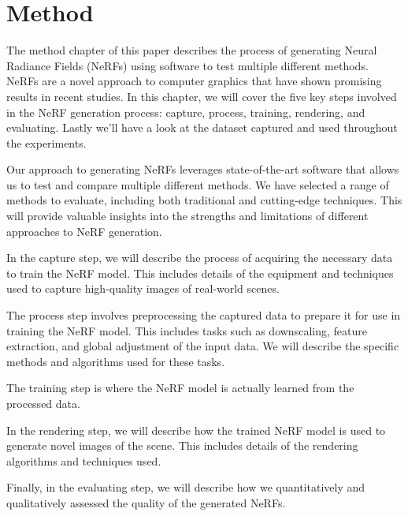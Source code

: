 \chapter{Method}

The method chapter of this paper describes the process of generating Neural Radiance Fields (NeRFs) using software to test multiple different methods. NeRFs are a novel approach to computer graphics that have shown promising results in recent studies. In this chapter, we will cover the five key steps involved in the NeRF generation process: capture, process, training, rendering, and evaluating. Lastly we'll have a look at the dataset captured and used throughout the experiments.

Our approach to generating NeRFs leverages state-of-the-art software that allows us to test and compare multiple different methods. We have selected a range of methods to evaluate, including both traditional and cutting-edge techniques. This will provide valuable insights into the strengths and limitations of different approaches to NeRF generation.

In the capture step, we will describe the process of acquiring the necessary data to train the NeRF model. This includes details of the equipment and techniques used to capture high-quality images of real-world scenes.

The process step involves preprocessing the captured data to prepare it for use in training the NeRF model. This includes tasks such as downscaling, feature extraction, and global adjustment of the input data. We will describe the specific methods and algorithms used for these tasks.

The training step is where the NeRF model is actually learned from the processed data. %

In the rendering step, we will describe how the trained NeRF model is used to generate novel images of the scene. This includes details of the rendering algorithms and techniques used.%

Finally, in the evaluating step, we will describe how we quantitatively and qualitatively assessed the quality of the generated NeRFs. %

